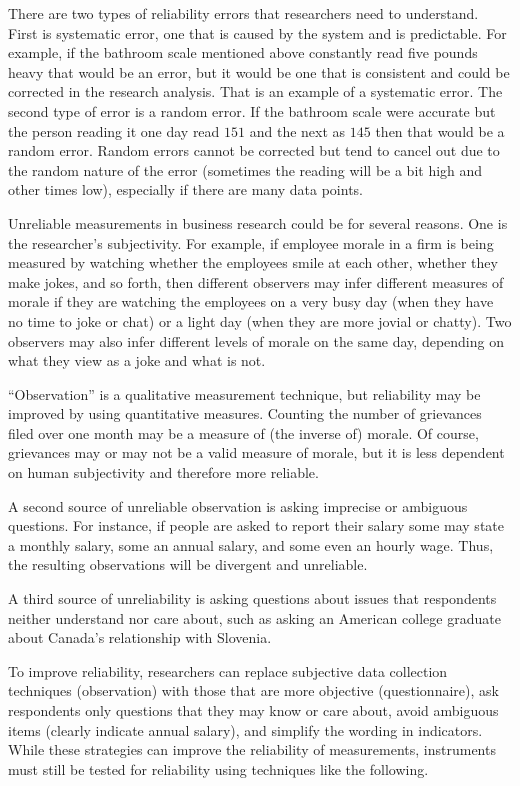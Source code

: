 There are two types of reliability errors that researchers need to understand. First is systematic error, one that is caused by the system and is predictable. For example, if the bathroom scale mentioned above constantly read five pounds heavy that would be an error, but it would be one that is consistent and could be corrected in the research analysis. That is an example of a systematic error. The second type of error is a random error. If the bathroom scale were accurate but the person reading it one day read $ 151 $ and the next as $ 145 $ then that would be a random error. Random errors cannot be corrected but tend to cancel out due to the random nature of the error (sometimes the reading will be a bit high and other times low), especially if there are many data points.

Unreliable measurements in business research could be for several reasons. One is the researcher's subjectivity. For example, if employee morale in a firm is being measured by watching whether the employees smile at each other, whether they make jokes, and so forth, then different observers may infer different measures of morale if they are watching the employees on a very busy day (when they have no time to joke or chat) or a light day (when they are more jovial or chatty). Two observers may also infer different levels of morale on the same day, depending on what they view as a joke and what is not. 

``Observation'' is a qualitative measurement technique, but reliability may be improved by using quantitative measures. Counting the number of grievances filed over one month may be a measure of (the inverse of) morale. Of course, grievances may or may not be a valid measure of morale, but it is less dependent on human subjectivity and therefore more reliable. 

A second source of unreliable observation is asking imprecise or ambiguous questions. For instance, if people are asked to report their salary some may state a monthly salary, some an annual salary, and some even an hourly wage. Thus, the resulting observations will be divergent and unreliable. 

A third source of unreliability is asking questions about issues that respondents neither understand nor care about, such as asking an American college graduate about Canada's relationship with Slovenia.

To improve reliability, researchers can replace subjective data collection techniques (observation) with those that are more objective (questionnaire), ask respondents only questions that they may know or care about, avoid ambiguous items (\eg clearly indicate annual salary), and simplify the wording in indicators. While these strategies can improve the reliability of measurements, instruments must still be tested for reliability using techniques like the following.


